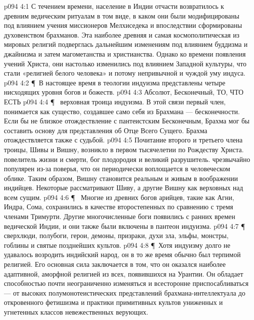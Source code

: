 \vs p094 4:1 С течением времени, население в Индии отчасти возвратилось к древним ведическим ритуалам в том виде, в каком они были модифицированы под влиянием учения миссионеров Мелхиседека и впоследствии сформированы духовенством брахманов. Эта наиболее древняя и самая космополитическая из мировых религий подверглась дальнейшим изменениям под влиянием буддизма и джайнизма и затем магометанства и христианства. Однако ко времени появления учений Христа, они настолько изменились под влиянием Западной культуры, что стали «религией белого человека» и потому непривычной и чуждой уму индуса.
\vs p094 4:2 \P\ В настоящее время в теологии индуизма представлены четыре нисходящих уровня богов и божеств.
\vs p094 4:3 \bibnobreakspace {} Абсолют, Бесконечный, ТО, ЧТО ЕСТЬ
\vs p094 4:4 \P\ \bibnobreakspace {} верховная троица индуизма. В этой связи первый член,  понимается как существо, создавшее само себя из Брахмана --- бесконечности. Если бы не близкое отождествление с пантеистским Бесконечным, Брахма мог бы составить основу для представления об Отце Всего Сущего. Брахма отождествляется также с судьбой.
\vs p094 4:5 Почитание второго и третьего члена троицы, Шивы и Вишну, возникло в первом тысячелетии по Рождеству Христа.  повелитель жизни и смерти, бог плодородия и великий разрушитель.  чрезвычайно популярен из\hyp{}за поверья, что он периодически воплощается в человеческом облике. Таким образом, Вишну становится реальным и живым в воображении индийцев. Некоторые рассматривают Шиву, а другие Вишну как верховных над всем сущим.
\vs p094 4:6 \P\ \bibnobreakspace {} Многие из древних богов арийцев, такие как Агни, Индра, Сома, сохранились в качестве второстепенных по сравнению с тремя членами Тримурти. Другие многочисленные боги появились с ранних времен ведической Индии, и они также были включены в пантеон индуизма.
\vs p094 4:7 \P\ \bibnobreakspace {} сверхлюди, полубоги, герои, демоны, призраки, духи зла, эльфы, монстры, гоблины и святые позднейших культов.
\vs p094 4:8 \P\ Хотя индуизму долго не удавалось возродить индийский народ, он в то же время обычно был терпимой религией. Его основная сила заключается в том, что он оказался наиболее адаптивной, аморфной религией из всех, появившихся на Урантии. Он обладает способностью почти неограниченно изменяться и всесторонне приспосабливаться --- от высоких полумонотеистических представлений брахмана\hyp{}интеллектуала до откровенного фетишизма и практики примитивных культов униженных и угнетенных классов невежественных верующих.
